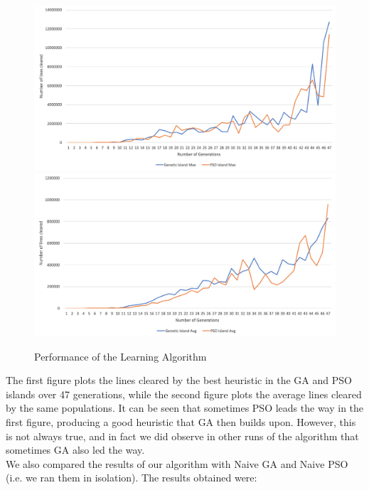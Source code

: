 \documentclass[12pt]{article}
\begin{document}
	\begin{figure}[h]
		\includegraphics[scale=0.28]{learning/AlgoMax}
		\includegraphics[scale=0.28]{learning/AlgoAvg}
		\centering
		\caption{Performance of the Learning Algorithm}
		\label{fig:learning}
	\end{figure}

	The first figure plots the lines cleared by the best heuristic in
	the GA and PSO islands over 47 generations, while the second figure plots
	the average lines cleared by the same populations. It can be seen that sometimes PSO leads the
	way in the first figure, producing a good heuristic that GA then builds
	upon. However, this is not always true, and in fact we did observe in other
	runs of the algorithm that sometimes GA also led the way.\\
	We also compared the results of our algorithm with Naive GA and Naive PSO
	(i.e. we ran them in isolation). The results obtained were:\\
\end{document}
